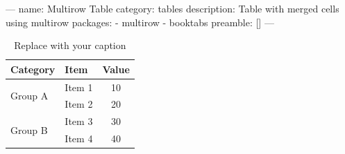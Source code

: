 ---
name: Multirow Table
category: tables
description: Table with merged cells using multirow
packages:
  - multirow
  - booktabs
preamble: []
---
\begin{table}[htbp]
\centering
\begin{tabular}{llc}
\toprule
\textbf{Category} & \textbf{Item} & \textbf{Value} \\
\midrule
\multirow{2}{*}{Group A} & Item 1 & 10 \\
                          & Item 2 & 20 \\
\midrule
\multirow{2}{*}{Group B} & Item 3 & 30 \\
                          & Item 4 & 40 \\
\bottomrule
\end{tabular}
\caption{Replace with your caption}
\end{table}

